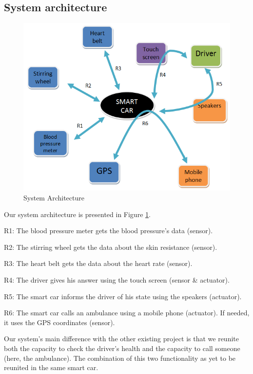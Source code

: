 \documentclass[a4paper]{article}
\begin{document}
\subsection{System architecture}
\begin{figure}
	\centering
	\includegraphics[scale=0.5]{architecture}		%
	\caption{System Architecture}					%
	\label{fig:sys}									%
\end{figure}
Our system architecture is presented in Figure \ref{fig:sys}.
\begin{description}\addtolength{\itemsep}{-0.5\baselineskip}
	\item{R1:} The blood pressure meter gets the blood pressure’s data (sensor).
	\item{R2:} The stirring wheel gets the data about the skin resistance (sensor).
	\item{R3:} The heart belt gets the data about the heart rate (sensor).
	\item{R4:} The driver gives his answer using the touch screen (sensor \& actuator).
	\item{R5:} The smart car informs the driver of his state using the speakers (actuator).
	\item{R6:} The smart car calls an ambulance using a mobile phone (actuator). If needed, it uses the GPS coordinates (sensor).
\end{description}
Our system’s main difference with the other existing project is that we reunite both the capacity to check the driver’s health and the capacity to call someone (here, the ambulance). The combination of this two functionality as yet to be reunited in the same smart car.
\newpage	%
\end{document}
